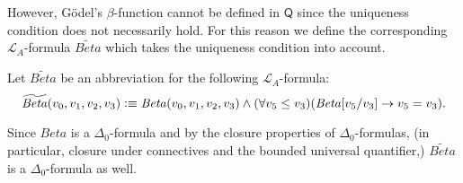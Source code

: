 However, G\"odel's $\beta$-function cannot be defined in $\mathsf{Q}$ since the uniqueness condition does not necessarily hold. For this reason we define the corresponding $\mathcal{L}_A$-formula $\mathit{\widetilde{Beta}}$ which takes the uniqueness condition into account.

\begin{dfn}
Let $\mathit{\widetilde{Beta}}$ be an abbreviation for the following $\mathcal{L}_A$-formula: \[ \mathit{\widetilde{Beta}}(v_0,v_1,v_2,v_3)\vcentcolon \equiv \mathit{Beta}(v_0,v_1,v_2,v_3) \wedge (\forall v_5 \le v_3)(\mathit{Beta}[v_5/v_3] \rightarrow v_5 = v_3).\]
\end{dfn}
Since $\mathit{Beta}$ is a $\Delta_0$-formula and by the closure properties of $\Delta_0$-formulas, (in particular, closure under connectives and the bounded universal quantifier,) $\mathit{\widetilde{Beta}}$ is a $\Delta_0$-formula as well.

